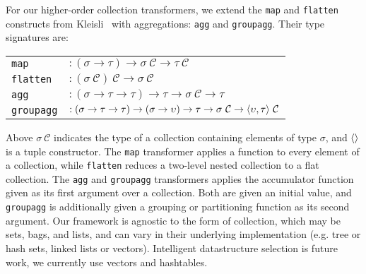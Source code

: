 For our higher-order collection transformers, we extend the \texttt{map} and
\texttt{flatten} constructs from Kleisli~\cite{buneman-kleisli:95} with
aggregations: \texttt{agg} and \texttt{groupagg}. Their type signatures are:


\vspace{1mm}\hspace{-4mm}
\begin{tabular}{p{1cm}l}
\texttt{map}
    & $: (\sigma \rightarrow \tau)
           \rightarrow \sigma \ \mathcal{C}
           \rightarrow \tau \ \mathcal{C}$\\
\texttt{flatten}       
    & $: (\sigma\ \mathcal{C}) \ \mathcal{C}
           \rightarrow \sigma \ \mathcal{C}$ \\
\texttt{agg}
    & $: (\sigma \rightarrow \tau \rightarrow \tau)
           \rightarrow \tau
           \rightarrow \sigma \ \mathcal{C}
           \rightarrow \tau$ \\
\texttt{groupagg}
    & $: (\sigma \rightarrow \tau \rightarrow \tau)
           \rightarrow (\sigma \rightarrow \upsilon)
           \rightarrow \tau
           \rightarrow \sigma \ \mathcal{C}
           \rightarrow {\langle\upsilon, \tau\rangle} \ \mathcal{C}$ \\
\end{tabular}


\vspace{1mm}
\noindent Above $\sigma \ \mathcal{C}$ indicates the type of a collection
containing elements of type $\sigma$, and ${\langle\rangle}$ is a tuple constructor. The
\texttt{map} transformer applies a function to every element of a collection,
while \texttt{flatten} reduces a two-level nested collection to a flat
collection. The \texttt{agg} and \texttt{groupagg} transformers applies the
accumulator function given as its first argument over a collection. Both are
given an initial value, and \texttt{groupagg} is additionally given a grouping
or partitioning function as its second argument. Our framework is agnostic to
the form of collection, which may be sets, bags, and lists, and
can vary in their underlying implementation (e.g. tree or hash sets, linked lists or
vectors). Intelligent datastructure selection is future work, we currently use
vectors and hashtables.

